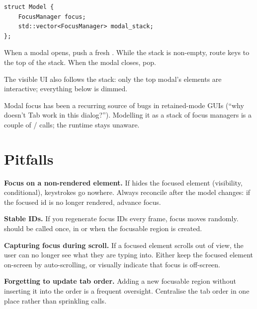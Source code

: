 \begin{lstlisting}
struct Model {
    FocusManager focus;
    std::vector<FocusManager> modal_stack;
};
\end{lstlisting}

When a modal opens, push a fresh . While the
stack is non-empty, route keys to the top of the stack. When the
modal closes, pop.

The visible UI also follows the stack: only the top modal's
elements are interactive; everything below is dimmed.

\begin{idea}
Modal focus has been a recurring source of bugs in
retained-mode GUIs (``why doesn't Tab work in this dialog?'').
Modelling it as a stack of focus managers is a couple of
 /  calls; the runtime stays
unaware.
\end{idea}

\section{Pitfalls}

\begin{warning}
\textbf{Focus on a non-rendered element.} If  hides
the focused element (visibility, conditional), keystrokes go
nowhere. Always reconcile after the model changes: if the
focused id is no longer rendered, advance focus.
\end{warning}

\begin{warning}
\textbf{Stable IDs.} If you regenerate focus IDs every frame,
focus moves randomly.  should be called
once, in  or when the focusable region is created.
\end{warning}

\begin{warning}
\textbf{Capturing focus during scroll.} If a focused element
scrolls out of view, the user can no longer see what they are
typing into. Either keep the focused element on-screen by
auto-scrolling, or visually indicate that focus is off-screen.
\end{warning}

\begin{warning}
\textbf{Forgetting to update tab order.} Adding a new focusable
region without inserting it into the order is a frequent
oversight. Centralise the tab order in one place rather than
sprinkling  calls.
\end{warning}

